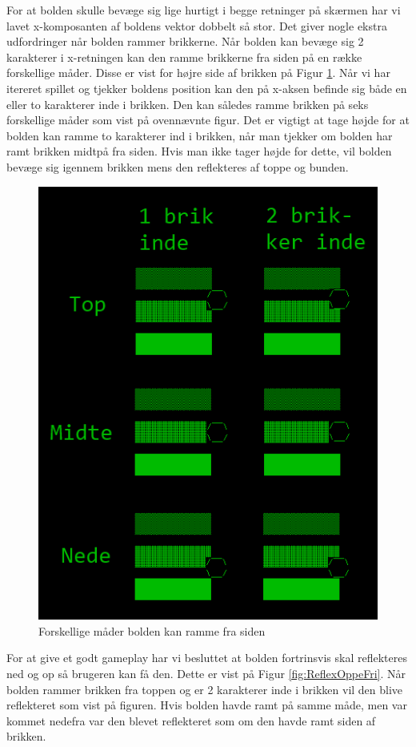 \begin{itemize}
For at bolden skulle bevæge sig lige hurtigt i begge retninger på skærmen har vi lavet x-komposanten af boldens vektor dobbelt så stor. Det giver nogle ekstra udfordringer når bolden rammer brikkerne. Når bolden kan bevæge sig 2 karakterer i x-retningen kan den ramme brikkerne fra siden på en række forskellige måder. Disse er vist for højre side af brikken på Figur \ref{fig:SideReflexSamlet}. 
Når vi har itereret spillet og tjekker boldens position kan den på x-aksen befinde sig både en eller to karakterer inde i brikken. Den kan således ramme brikken på seks forskellige måder som vist på ovennævnte figur. Det er vigtigt at tage højde for at bolden kan ramme to karakterer ind i brikken, når man tjekker om bolden har ramt brikken midtpå fra siden. Hvis man ikke tager højde for dette, vil bolden bevæge sig igennem brikken mens den reflekteres af toppe og bunden. 

\begin{figure}[h!]
\centering
\includegraphics[scale=0.75]{figs/side_reflex_samlet.png}
\caption{Forskellige måder bolden kan ramme fra siden}
\label{fig:SideReflexSamlet}
\end{figure}


For at give et godt gameplay har vi besluttet at bolden fortrinsvis skal reflekteres ned og op så brugeren kan få den. Dette er vist på Figur \ref{fig:ReflexOppeFri}. Når bolden rammer brikken fra toppen og er 2 karakterer inde i brikken vil den blive reflekteret som vist på figuren. Hvis bolden havde ramt på samme måde, men var kommet nedefra var den blevet reflekteret som om den havde ramt siden af brikken.


\end{itemize}
